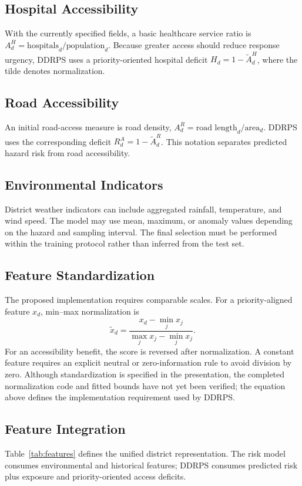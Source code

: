 \documentclass[conference]{IEEEtran}
\begin{document}
\subsection{Hospital Accessibility}
With the currently specified fields, a basic healthcare service ratio is
$A^{H}_d=\text{hospitals}_d/\text{population}_d$. Because greater access should
reduce response urgency, DDRPS uses a priority-oriented hospital deficit
$H_d=1-\widetilde{A}^{H}_d$, where the tilde denotes normalization.

\subsection{Road Accessibility}
An initial road-access measure is road density,
$A^{R}_d=\text{road length}_d/\text{area}_d$. DDRPS uses the corresponding
deficit $R^{A}_d=1-\widetilde{A}^{R}_d$. This notation separates predicted
hazard risk from road accessibility.

\subsection{Environmental Indicators}
District weather indicators can include aggregated rainfall, temperature, and
wind speed. The model may use mean, maximum, or anomaly values depending on the
hazard and sampling interval. The final selection must be performed within the
training protocol rather than inferred from the test set.

\subsection{Feature Standardization}
The proposed implementation requires comparable scales. For a priority-aligned
feature $x_d$, min--max normalization is
\begin{equation}
\widetilde{x}_d=\frac{x_d-\min_j x_j}{\max_j x_j-\min_j x_j}.
\end{equation}
For an accessibility benefit, the score is reversed after normalization. A
constant feature requires an explicit neutral or zero-information rule to avoid
division by zero. Although standardization is specified in the presentation,
the completed normalization code and fitted bounds have not yet been verified;
the equation above defines the implementation requirement used by DDRPS.

\subsection{Feature Integration}
Table~\ref{tab:features} defines the unified district representation. The risk
model consumes environmental and historical features; DDRPS consumes predicted
risk plus exposure and priority-oriented access deficits.
\end{document}
